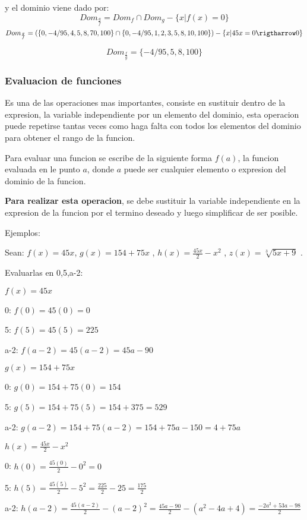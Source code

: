     y el dominio viene dado por:
    $$ Dom_{\frac{g}{f}}= Dom_f \cap Dom_g -\{x|f(x)=0\}$$
    $$ Dom_{\frac{g}{f} } =  (\{0,-4/95,4,5,8,70,100\} \cap \{0,-4/95,1,2,3,5,8,10,100\}) -\{x|45x=0\rigtharrow 0 \}$$

    $$Dom_{\frac{f}{g} }=\{-4/95,5,8,100\} $$

\subsubsection*{Evaluacion de funciones} \label{Evaluacion_de_funciones}

Es una de las operaciones mas importantes, consiste en sustituir dentro de la
expresion, la variable independiente por un elemento del dominio, esta operacion
puede repetirse tantas veces como haga falta con todos los elementos del dominio
para obtener el rango de la funcion.

Para evaluar una funcion se escribe de la siguiente forma $ f(a) $, la funcion
evaluada en le punto $a$, donde $a$ puede ser cualquier elemento o expresion
del dominio de la funcion.

\textbf{Para realizar esta operacion}, se debe sustituir la variable independiente
en la expresion de la funcion por el termino deseado y luego simplificar de ser
posible.

    Ejemplos:

    Sean:
    $f(x)= 45x$,
    $ g(x)=154 + 75x $  ,
    $ h(x)=\frac{45x}{2} - x^2 $  ,
    $ z(x) = \sqrt[3]{5x+9}  $  .

    Evaluarlas en {0,5,a-2}:

    $f(x)= 45x$

    0: $ f(0)= 45(0)=0$

    5: $ f(5)=45(5)=225 $

    a-2: $ f(a-2)= 45(a-2)=45a-90 $


    $ g(x)=154 + 75x $

    0: $ g(0)=154+75(0)=154 $

    5:  $ g(5)=154+75(5)=154+375=529 $

    a-2: $ g(a-2)=154+75(a-2)=154+75a-150=4+75a $


    $ h(x)=\frac{45x}{2} - x^2 $

    0: $ h(0)=\frac{45(0)}{2} - 0^2 = 0$


    5: $ h(5)=\frac{45(5)}{2} - 5^2 =\frac{225}{2}- 25=\frac{175}{2}  $


    a-2: $ h(a-2)=\frac{45(a-2)}{2} - (a-2)^2= \frac{45a-90}{2} -(a^2-4a+4)=\frac{-2a^2+53a-98}{2}  $


